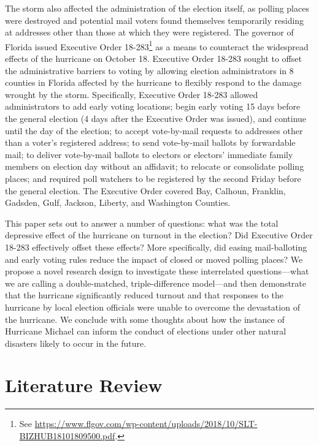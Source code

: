\documentclass[
  12pt,
]{article}
\begin{document}
The storm also affected the administration of the election itself, as polling places were destroyed and potential mail voters found themselves temporarily residing at addresses other than those at which they were registered. The governor of Florida issued Executive Order 18-283\footnote{See \url{https://www.flgov.com/wp-content/uploads/2018/10/SLT-BIZHUB18101809500.pdf}.} as a means to counteract the widespread effects of the hurricane on October 18. Executive Order 18-283 sought to offset the administrative barriers to voting by allowing election administrators in 8 counties in Florida affected by the hurricane to flexibly respond to the damage wrought by the storm. Specifically, Executive Order 18-283 allowed administrators to add early voting locations; begin early voting 15 days before the general election (4 days after the Executive Order was issued), and continue until the day of the election; to accept vote-by-mail requests to addresses other than a voter's registered address; to send vote-by-mail ballots by forwardable mail; to deliver vote-by-mail ballots to electors or electors' immediate family members on election day without an affidavit; to relocate or consolidate polling places; and required poll watchers to be registered by the second Friday before the general election. The Executive Order covered Bay, Calhoun, Franklin, Gadsden, Gulf, Jackson, Liberty, and Washington Counties.

This paper sets out to answer a number of questions: what was the total depressive effect of the hurricane on turnout in the election? Did Executive Order 18-283 effectively offset these effects? More specifically, did easing mail-balloting and early voting rules reduce the impact of closed or moved polling places? We propose a novel research design to investigate these interrelated questions---what we are calling a double-matched, triple-difference model---and then demonstrate that the hurricane significantly reduced turnout and that responses to the hurricane by local election officials were unable to overcome the devastation of the hurricane. We conclude with some thoughts about how the instance of Hurricane Michael can inform the conduct of elections under other natural disasters likely to occur in the future.

\hypertarget{literature-review}{%
\section*{Literature Review}\label{literature-review}}
\end{document}
